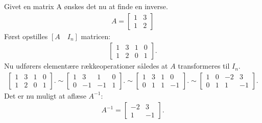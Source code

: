 \begin{eks}
Givet en matrix A ønskes det nu at finde en inverse. 
\begin{align*}
A= \begin{bmatrix}
1 & 3 \\
1 & 2
\end{bmatrix}
\end{align*}
Først opstilles $[A \quad I_n]$ matricen: 
\begin{align*}
\begin{bmatrix}
1 & 3 & 1 & 0 \\
1 & 2 & 0 & 1
\end{bmatrix}.
\end{align*}
Nu udførers elementære rækkeoperationer således at $A$ transformeres til $I_n$. 
\begin{align*}
\begin{bmatrix}
1 & 3 & 1 & 0 \\
1 & 2 & 0 & 1
\end{bmatrix}.
\sim \begin{bmatrix}
1 & 3 & 1 & 0 \\
0 & -1 & -1 & 1
\end{bmatrix}.
\sim \begin{bmatrix}
1 & 3 & 1 & 0 \\
0 & 1 & 1 & -1
\end{bmatrix}.
\sim \begin{bmatrix}
1 & 0 & -2 & 3 \\
0 & 1 & 1 & -1
\end{bmatrix}.
\end{align*}
Det er nu muligt at aflæse $A^{-1}$:
\begin{align*}
A^{-1} =\begin{bmatrix}
-2 & 3\\
1 & -1 
\end{bmatrix}.
\end{align*}
\end{eks}

